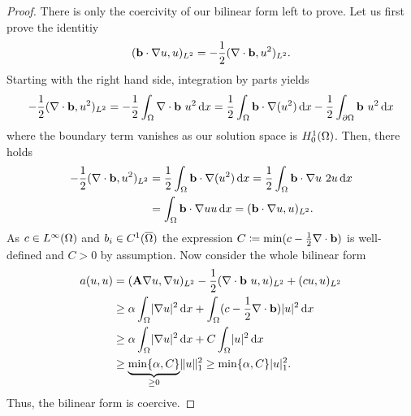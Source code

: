 \begin{proof}
  There is only the coercivity of our bilinear
  form left to prove.
  Let us first prove the identitiy
  \begin{gather*}
    (\mathbf b\cdot\nabla u,u)_{L^2} = -\frac12 (\nabla\cdot \mathbf b,u^2)_{L^2}.
  \end{gather*}
  Starting with the right hand side, integration by parts yields
  \begin{gather*}
    -\frac12 (\nabla\cdot \mathbf b,u^2)_{L^2} = -\frac12 \int_\Omega \nabla\cdot\mathbf b~ u^2 \,\mathrm{d} x
    = \frac12 \int_\Omega \mathbf b\cdot\nabla(u^2)\,\mathrm{d} x - \frac12 \int_{\partial\Omega} \mathbf b~ u^2\,\mathrm{d} x
  \end{gather*}
  where the boundary term vanishes as our solution space is $H^1_0(\Omega)$.
  Then, there holds
  \begin{gather*}
    \begin{split}
      -\frac12 (\nabla\cdot \mathbf b,u^2)_{L^2} &= \frac12 \int_\Omega \mathbf b\cdot\nabla(u^2)\,\mathrm{d} x
      = \frac12 \int_\Omega \mathbf b\cdot\nabla u~ 2u\,\mathrm{d} x
      \\
      &= \int_\Omega \mathbf b\cdot\nabla u u\,\mathrm{d} x = (\mathbf b\cdot\nabla u,u)_{L^2}.
    \end{split}
  \end{gather*}
  As $c\in L^\infty(\Omega)$ and $b_i\in C^1(\overline{\Omega})$ the
  expression $C\coloneqq \min(c-\frac12 \nabla\cdot \mathbf b)$ is
  well-defined and $C>0$ by assumption.
  Now consider the whole bilinear form
  \begin{align*}
    a(u,u) &= (\mathbf A\nabla u,\nabla u)_{L^2} - \frac12 (\nabla \cdot \mathbf b~ u ,u)_{L^2} + (cu,u)_{L^2} \\
    &\ge \alpha \int_\Omega \lvert\nabla u\rvert^2 \,\mathrm{d} x + \int_\Omega (c-\frac12 \nabla \cdot \mathbf b)\lvert u\rvert^2 \,\mathrm{d} x \\
    &\ge \alpha \int_\Omega \lvert\nabla u\rvert^2 \,\mathrm{d} x + C \int_\Omega \lvert u\rvert^2 \,\mathrm{d} x \\
    &\ge \underbrace{\min\{\alpha,C \}}_{\ge 0}\lVert u\rVert_1^2 \ge \min\{\alpha,C \} \lvert u\rvert_1^2.
  \end{align*}
  Thus, the bilinear form is coercive.
\end{proof}



